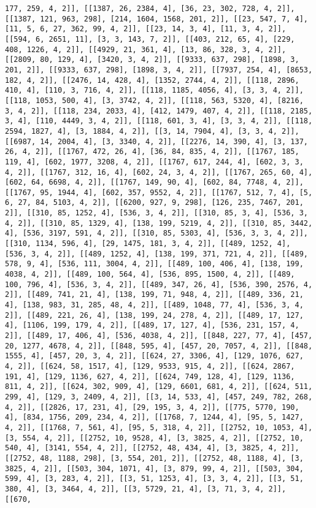\documentclass[12pt,fleqn]{article}\usepackage{../../common}
\begin{document}
\begin{verbatim}
177, 259, 4, 2]], [[1387, 26, 2384, 4], [36, 23, 302, 728, 4, 2]], [[1387, 121, 963, 298], [214, 1604, 1568, 201, 2]], [[23, 547, 7, 4], [11, 5, 6, 27, 362, 99, 4, 2]], [[23, 14, 3, 4], [11, 3, 4, 2]], [[594, 6, 2651, 11], [3, 3, 143, 7, 2]], [[403, 212, 65, 4], [229, 408, 1226, 4, 2]], [[4929, 21, 361, 4], [13, 86, 328, 3, 4, 2]], [[2809, 80, 129, 4], [3420, 3, 4, 2]], [[9333, 637, 298], [1898, 3, 201, 2]], [[9333, 637, 298], [1898, 3, 4, 2]], [[7937, 254, 4], [8653, 182, 4, 2]], [[2476, 14, 428, 4], [1352, 2744, 4, 2]], [[118, 2896, 410, 4], [110, 3, 716, 4, 2]], [[118, 1185, 4056, 4], [3, 3, 4, 2]], [[118, 1053, 500, 4], [3, 3742, 4, 2]], [[118, 563, 5320, 4], [8216, 3, 4, 2]], [[118, 234, 2033, 4], [412, 1479, 407, 4, 2]], [[118, 2185, 3, 4], [110, 4449, 3, 4, 2]], [[118, 601, 3, 4], [3, 3, 4, 2]], [[118, 2594, 1827, 4], [3, 1884, 4, 2]], [[3, 14, 7904, 4], [3, 3, 4, 2]], [[6987, 14, 2004, 4], [3, 3340, 4, 2]], [[2276, 14, 390, 4], [3, 137, 26, 4, 2]], [[1767, 472, 26, 4], [36, 84, 835, 4, 2]], [[1767, 185, 119, 4], [602, 1977, 3208, 4, 2]], [[1767, 617, 244, 4], [602, 3, 3, 4, 2]], [[1767, 312, 16, 4], [602, 24, 3, 4, 2]], [[1767, 265, 60, 4], [602, 64, 6698, 4, 2]], [[1767, 149, 90, 4], [602, 84, 7748, 4, 2]], [[1767, 95, 1944, 4], [602, 357, 9552, 4, 2]], [[1767, 512, 7, 4], [5, 6, 27, 84, 5103, 4, 2]], [[6200, 927, 9, 298], [126, 235, 7467, 201, 2]], [[310, 85, 1252, 4], [536, 3, 4, 2]], [[310, 85, 3, 4], [536, 3, 4, 2]], [[310, 85, 1329, 4], [138, 199, 5219, 4, 2]], [[310, 85, 3442, 4], [536, 3197, 591, 4, 2]], [[310, 85, 5303, 4], [536, 3, 3, 4, 2]], [[310, 1134, 596, 4], [29, 1475, 181, 3, 4, 2]], [[489, 1252, 4], [536, 3, 4, 2]], [[489, 1252, 4], [138, 199, 371, 721, 4, 2]], [[489, 578, 9, 4], [536, 111, 3004, 4, 2]], [[489, 100, 406, 4], [138, 199, 4038, 4, 2]], [[489, 100, 564, 4], [536, 895, 1500, 4, 2]], [[489, 100, 796, 4], [536, 3, 4, 2]], [[489, 347, 26, 4], [536, 390, 2576, 4, 2]], [[489, 741, 21, 4], [138, 199, 71, 948, 4, 2]], [[489, 336, 21, 4], [138, 983, 31, 285, 48, 4, 2]], [[489, 1048, 77, 4], [536, 3, 4, 2]], [[489, 221, 26, 4], [138, 199, 24, 278, 4, 2]], [[489, 17, 127, 4], [1106, 199, 179, 4, 2]], [[489, 17, 127, 4], [536, 231, 157, 4, 2]], [[489, 17, 406, 4], [536, 4038, 4, 2]], [[848, 227, 77, 4], [457, 20, 1277, 4678, 4, 2]], [[848, 595, 4], [457, 20, 7057, 4, 2]], [[848, 1555, 4], [457, 20, 3, 4, 2]], [[624, 27, 3306, 4], [129, 1076, 627, 4, 2]], [[624, 58, 1517, 4], [129, 9533, 915, 4, 2]], [[624, 2867, 191, 4], [129, 1136, 627, 4, 2]], [[624, 749, 128, 4], [129, 1136, 811, 4, 2]], [[624, 302, 909, 4], [129, 6601, 681, 4, 2]], [[624, 511, 299, 4], [129, 3, 2409, 4, 2]], [[3, 14, 533, 4], [457, 249, 782, 268, 4, 2]], [[2826, 17, 231, 4], [29, 195, 3, 4, 2]], [[775, 5770, 190, 4], [834, 1756, 209, 234, 4, 2]], [[1768, 7, 1244, 4], [95, 5, 1427, 4, 2]], [[1768, 7, 561, 4], [95, 5, 318, 4, 2]], [[2752, 10, 1053, 4], [3, 554, 4, 2]], [[2752, 10, 9528, 4], [3, 3825, 4, 2]], [[2752, 10, 540, 4], [3141, 554, 4, 2]], [[2752, 48, 434, 4], [3, 3825, 4, 2]], [[2752, 48, 1188, 298], [3, 554, 201, 2]], [[2752, 48, 1188, 4], [3, 3825, 4, 2]], [[503, 304, 1071, 4], [3, 879, 99, 4, 2]], [[503, 304, 599, 4], [3, 283, 4, 2]], [[3, 51, 1253, 4], [3, 3, 4, 2]], [[3, 51, 380, 4], [3, 3464, 4, 2]], [[3, 5729, 21, 4], [3, 71, 3, 4, 2]], [[670, 
\end{verbatim}
\end{document}
